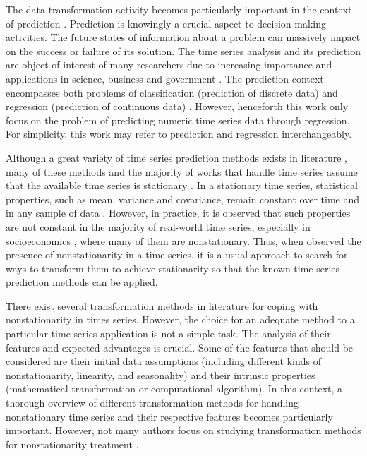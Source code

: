 \documentclass[11pt]{dippg}
\begin{document}
The data transformation activity becomes particularly important in the context of prediction \cite{han_data_2011,esling_time-series_2012}. Prediction is knowingly a crucial aspect to decision-making activities. The future states of information about a problem can massively impact on the success or failure of its solution. The time series analysis and its prediction are object of interest of many researchers due to increasing importance and applications in science, business and government \cite{salles_evaluating_2015}. The prediction context encompasses both problems of classification (prediction of discrete data) and regression (prediction of continuous data) \cite{han_data_2011,esling_time-series_2012,buza_classification_2018}. However, henceforth this work only focus on the problem of predicting numeric time series data through regression. For simplicity, this work may refer to prediction and regression interchangeably.

Although a great variety of time series prediction methods exists in literature \cite{cheng_time_2015}, many of these methods and the majority of works that handle time series assume that the available time series is stationary \cite{gujarati_basic_2002}. In a stationary time series, statistical properties, such as mean, variance and covariance, remain constant over time and in any sample of data \cite{gujarati_basic_2002,shumway_time_2017}. However, in practice, it is observed that such properties are not constant in the majority of real-world time series, especially in socioeconomics \cite{tsay_analysis_2010}, where many of them are nonstationary. Thus, when observed the presence of nonstationarity in a time series, it is a usual approach to search for ways to transform them to achieve stationarity so that the known time series prediction methods can be applied.

There exist several transformation methods in literature for coping with nonstationarity in times series. However, the choice for an adequate method to a particular time series application is not a simple task. The analysis of their features and expected advantages is crucial. Some of the features that should be considered are their initial data assumptions (including different kinds of nonstationarity, linearity, and seasonality) and their intrinsic properties (mathematical transformation or computational algorithm). In this context, a thorough overview of different transformation methods for handling nonstationary time series and their respective features becomes particularly important. However, not many authors focus on studying transformation methods for nonstationarity treatment \cite{yang_nonstationarity_2010, cheng_time_2015}.
\end{document}
